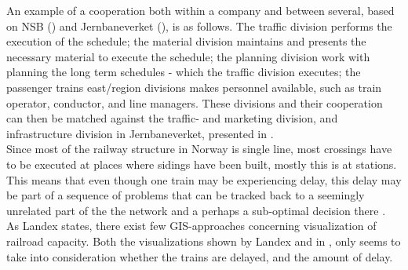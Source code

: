 An example of a cooperation both within a company and between several, based on
NSB () and Jernbaneverket (), is as follows. The traffic division 
performs the execution of the schedule; the material division maintains and
presents the necessary material to execute the schedule; the planning division
work with planning the long term schedules - which the traffic division
executes; the passenger trains east/region divisions makes personnel 
available, such as train operator, conductor, and line managers. These 
divisions and their cooperation can then be matched against the traffic- and 
marketing division, and infrastructure division in Jernbaneverket, presented in
.\\

Since most of the railway structure in Norway is single line, most crossings
have to be executed at places where sidings have been built, mostly this is
at stations. This means that even though one train may be experiencing delay, 
this delay may be part of a sequence of problems that can be tracked back to a 
seemingly unrelated part of the the network and a perhaps a sub-optimal 
decision there \cite{cule2011mining}.
\\

As Landex\cite{landex2009gis} states, there exist few GIS-approaches concerning
visualization of railroad capacity. Both the visualizations shown by Landex and
in  , 
only seems to take into consideration whether the trains are delayed, and the 
amount of delay. 



